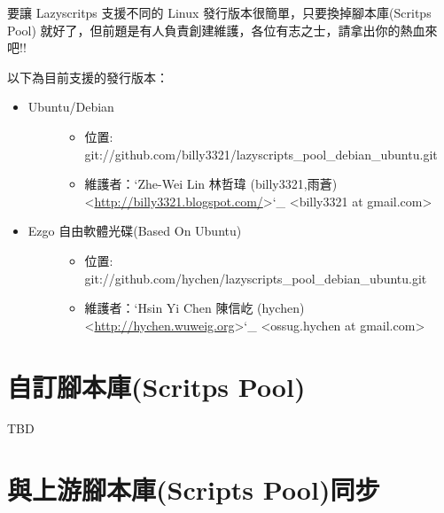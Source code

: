 \documentclass[letterpaper,10pt,english]{manual}
\begin{document}
要讓 Lazyscritps 支援不同的 Linux 發行版本很簡單，只要換掉腳本庫(Scritps Pool)
就好了，但前題是有人負責創建維護，各位有志之士，請拿出你的熱血來吧!!

以下為目前支援的發行版本：
\begin{itemize}
\item {} \begin{description}
\item[Ubuntu/Debian]\begin{itemize}
\item {} 
位置: git://github.com/billy3321/lazyscripts\_pool\_debian\_ubuntu.git

\item {} 
維護者：{}`Zhe-Wei Lin 林哲瑋 (billy3321,雨蒼) \textless{}\href{http://billy3321.blogspot.com/}{http://billy3321.blogspot.com/}\textgreater{}{}`\_ \textless{}billy3321 at gmail.com\textgreater{}

\end{itemize}

\end{description}

\item {} \begin{description}
\item[Ezgo 自由軟體光碟(Based On Ubuntu)]\begin{itemize}
\item {} 
位置: git://github.com/hychen/lazyscripts\_pool\_debian\_ubuntu.git

\item {} 
維護者：{}`Hsin Yi Chen 陳信屹 (hychen) \textless{}\href{http://hychen.wuweig.org}{http://hychen.wuweig.org}\textgreater{}{}`\_ \textless{}ossug.hychen at gmail.com\textgreater{}

\end{itemize}

\end{description}

\end{itemize}


\section{自訂腳本庫(Scritps Pool)}

TBD


\section{與上游腳本庫(Scripts Pool)同步}
\end{document}
